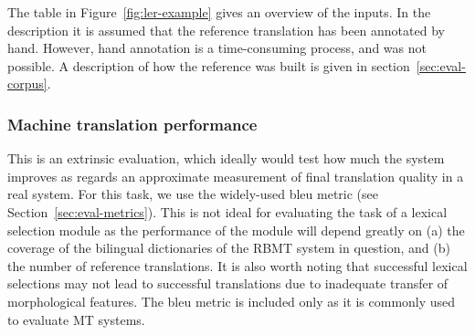 \documentclass[11pt]{article}
\newcommand{\comment}[1]{\todo{#1}}
\begin{document}


The table in Figure~\ref{fig:ler-example} gives an
overview of the inputs. In the description it is assumed that the
reference translation has been annotated by hand. However, hand
annotation is a time-consuming process, and was not possible. A
description of how the reference was built is given in
section~\ref{sec:eval-corpus}.

\subsubsection{Machine translation performance} 
This is an extrinsic evaluation, which ideally would test how much the
system improves as regards an approximate measurement of final
translation quality in a real system. For this task, we use the
widely-used {\sc bleu} metric (see
Section~\ref{sec:eval-metrics}). This is not ideal for evaluating the
task of a lexical selection module as the performance of the module
will depend greatly on (a) the coverage of the bilingual dictionaries
of the RBMT system in question, and (b) the number of reference
translations. It is also worth noting that successful lexical
selections may not lead to successful translations due to inadequate
transfer of morphological features.
The {\sc bleu} metric \citep{papineni02} is
included only as it is commonly used to evaluate MT systems. 

\end{document}
